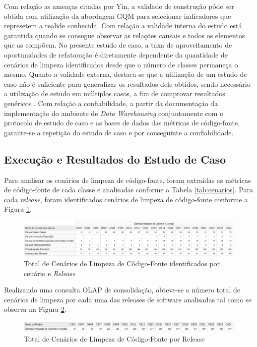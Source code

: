 Com relação as ameaças citadas por Yin, a validade de construção pôde ser obtida com utilização da abordagem GQM para selecionar indicadores que represetem a realide conhecida. Com relação a validade interna do estudo está garantida quando se consegue observar as relações causais e todos os elementos que as compõem. No presente estudo de caso, a taxa de aproveitamento de oportunidades de refatoração é diretamente dependente da quantidade de cenários de limpeza identificados desde que o número de classes permaneça o mesmo. Quanto a validade externa, destaca-se que a utilização de um estudo de caso não é suficiente para generalizar os resultados dele obtidos, sendo necessário a utilização de estudo em múltiplos casos, a fim de comprovar resultados genéricos \cite{yin2011applications}. Com relação a confiabilidade, a partir da documentação da implementação do ambiente de \textit{Data Warehousing} conjuntamente com o protocolo de estudo de caso e as bases de dados das métricas de código-fonte, garante-se a repetição do estudo de caso e por conseguinte a confiabilidade.

\subsection{Execução e Resultados do Estudo de Caso}
\label{sec:resultados}
Para analisar os cenários de limpeza de código-fonte, foram extraídas as métricas de código-fonte de cada classe e analisadas conforme a Tabela \ref{tab:cenarios}. Para cada \textit{release}, foram identificados cenários de limpeza de código-fonte conforme a Figura \ref{fig:cenarios-release}.


\begin{figure}[ht!]
\centering
\includegraphics[keepaspectratio=true,scale=0.43]{figuras/total-cenario-tipo.eps}
\caption{Total de Cenários de Limpeza de Código-Fonte identificados por cenário e \textit{Release}}
\label{fig:cenarios-release}
\end{figure}
\FloatBarrier


Realizando uma consulta OLAP de consolidação, obteve-se o número total de cenários de limpeza por cada uma das releases de software analisadas tal como se observa na Figura \ref{fig:cenarios-total}.

\begin{figure}[ht!]
\centering
\includegraphics[keepaspectratio=true,scale=0.45]{figuras/total-cenarios-release.eps}
\caption{Total de Cenários de Limpeza de Código-Fonte por Release}
\label{fig:cenarios-total}
\end{figure}
\FloatBarrier

